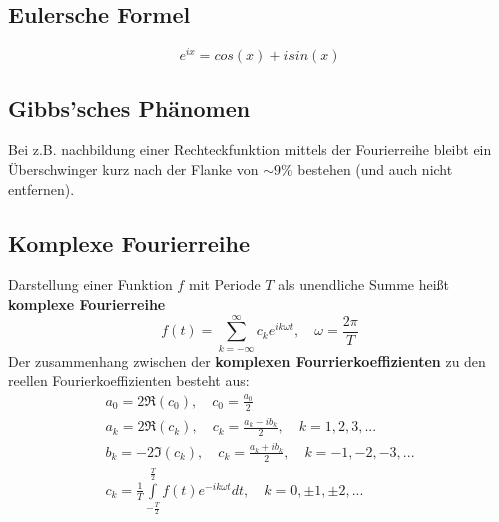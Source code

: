 \documentclass[12pt]{article}
\begin{document}
\subsection{Eulersche Formel}
\begin{equation*}
	e^{ix}=cos(x)+isin(x)
\end{equation*}
\subsection{Gibbs'sches Phänomen}
Bei z.B. nachbildung einer Rechteckfunktion mittels der Fourierreihe bleibt ein Überschwinger kurz nach der Flanke von $\sim 9\%$ bestehen (und auch nicht entfernen).
\subsection{Komplexe Fourierreihe}
Darstellung einer Funktion $f$ mit Periode $T$ als unendliche Summe heißt \textbf{komplexe Fourierreihe}
\begin{equation*}
	f(t) = \sum\limits_{k=-\infty}^{\infty}c_ke^{ik\omega t}, \quad \omega=\frac{2\pi}{T}
\end{equation*}
Der zusammenhang zwischen der \textbf{komplexen Fourrierkoeffizienten} zu den reellen Fourierkoeffizienten besteht aus:
\begin{gather*}
	a_0=2\Re(c_0), \quad c_0=\frac{a_0}{2}\\
	a_k=2\Re(c_k), \quad c_k=\frac{a_k-ib_k}{2}, \quad k=1,2,3,...\\
	b_k=-2\Im(c_k), \quad c_k=\frac{a_k+ib_k}{2}, \quad k=-1,-2,-3,...\\
	c_k=\frac{1}{T}\int\limits_{-\frac{T}{2}}^{\frac{T}{2}}f(t)e^{-ik\omega t}dt, \quad k=0,\pm1,\pm2,...
\end{gather*}
\newpage
\end{document}
